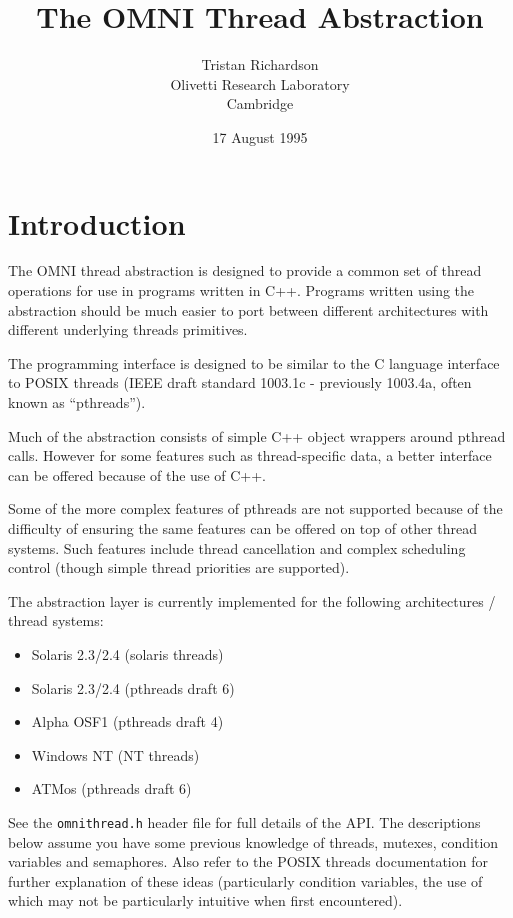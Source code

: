 \documentclass[11pt]{article}
\title{The OMNI Thread Abstraction}
\author{Tristan Richardson\\
Olivetti Research Laboratory \\
Cambridge \\
}
\date{17 August 1995}
\begin{document}
\maketitle

\section{Introduction}

The OMNI thread abstraction is designed to provide a common set of thread
operations for use in programs written in C++.  Programs written using the
abstraction should be much easier to port between different architectures with
different underlying threads primitives.

The programming interface is designed to be similar to the C language interface
to POSIX threads (IEEE draft standard 1003.1c - previously 1003.4a, often known
as ``pthreads'').

Much of the abstraction consists of simple C++ object wrappers around pthread
calls.  However for some features such as thread-specific data, a better
interface can be offered because of the use of C++.

Some of the more complex features of pthreads are not supported because of the
difficulty of ensuring the same features can be offered on top of other thread
systems.  Such features include thread cancellation and complex scheduling
control (though simple thread priorities are supported).

The abstraction layer is currently implemented for the following architectures
/ thread systems:

\begin{itemize}

\item Solaris 2.3/2.4 (solaris threads)
\item Solaris 2.3/2.4 (pthreads draft 6)
\item Alpha OSF1 (pthreads draft 4)
\item Windows NT (NT threads)
\item ATMos (pthreads draft 6)

\end{itemize}

See the {\tt omnithread.h} header file for full details of the API.  The
descriptions below assume you have some previous knowledge of threads, mutexes,
condition variables and semaphores.  Also refer to the POSIX threads
documentation for further explanation of these ideas (particularly condition
variables, the use of which may not be particularly intuitive when first
encountered).
\end{document}
